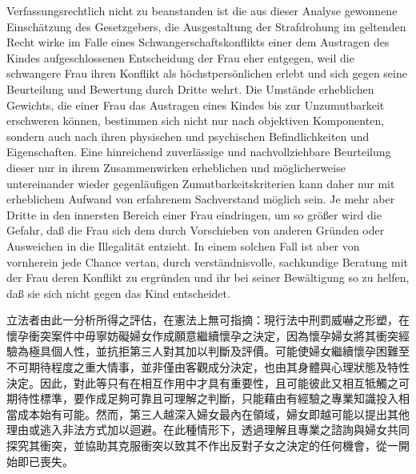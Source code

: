 \documentclass[12pt]{article}
\begin{document}
\begin{sourcepara}[title={原文D.74}]
Verfassungsrechtlich nicht zu beanstanden ist die aus dieser Analyse gewonnene Einschätzung des Gesetzgebers, die Ausgestaltung der Strafdrohung im geltenden Recht wirke im Falle eines Schwangerschaftskonflikts einer dem Austragen des Kindes aufgeschlossenen Entscheidung der Frau eher entgegen, weil die schwangere Frau ihren Konflikt als höchstpersönlichen erlebt und sich gegen seine Beurteilung und Bewertung durch Dritte wehrt. Die Umstände erheblichen Gewichts, die einer Frau das Austragen eines Kindes bis zur Unzumutbarkeit erschweren können, bestimmen sich nicht nur nach objektiven Komponenten, sondern auch nach ihren physischen und psychischen Befindlichkeiten und Eigenschaften. Eine hinreichend zuverlässige und nachvollziehbare Beurteilung dieser nur in ihrem Zusammenwirken erheblichen und möglicherweise untereinander wieder gegenläufigen Zumutbarkeitskriterien kann daher nur mit erheblichem Aufwand von erfahrenem Sachverstand möglich sein. Je mehr aber Dritte in den innersten Bereich einer Frau eindringen, um so größer wird die Gefahr, daß die Frau sich dem durch Vorschieben von anderen Gründen oder Ausweichen in die Illegalität entzieht. In einem solchen Fall ist aber von vornherein jede Chance vertan, durch verständnisvolle, sachkundige Beratung mit der Frau deren Konflikt zu ergründen und ihr bei seiner Bewältigung so zu helfen, daß sie sich nicht gegen das Kind entscheidet.
\end{sourcepara}
\begin{transpara}
立法者由此一分析所得之評估，在憲法上無可指摘：現行法中刑罰威嚇之形塑，在懷孕衝突案件中毋寧妨礙婦女作成願意繼續懷孕之決定，因為懷孕婦女將其衝突經驗為極具個人性，並抗拒第三人對其加以判斷及評價。可能使婦女繼續懷孕困難至不可期待程度之重大情事，並非僅由客觀成分決定，也由其身體與心理狀態及特性決定。因此，對此等只有在相互作用中才具有重要性，且可能彼此又相互牴觸之可期待性標準，要作成足夠可靠且可理解之判斷，只能藉由有經驗之專業知識投入相當成本始有可能。然而，第三人越深入婦女最內在領域，婦女即越可能以提出其他理由或逃入非法方式加以迴避。在此種情形下，透過理解且專業之諮詢與婦女共同探究其衝突，並協助其克服衝突以致其不作出反對子女之決定的任何機會，從一開始即已喪失。
\end{transpara}
\end{document}

